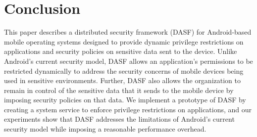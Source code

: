 \section{Conclusion}

This paper describes a distributed security framework (DASF) for
Android-based mobile operating systems designed to provide dynamic
privilege restrictions on applications and security policies on
sensitive data sent to the device.  Unlike Android's current security
model, DASF allows an application's permissions to be restricted
dynamically to address the security concerns of mobile devices being
used in sensitive environments.  Further, DASF also allows the
organization to remain in control of the sensitive data that it sends
to the mobile device by imposing security policies on that data.  We
implement a prototype of DASF by creating a system service to enforce
privilege restrictions on applications, and our experiments show that
DASF addresses the limitations of Android's current security model
while imposing a reasonable performance overhead. 





